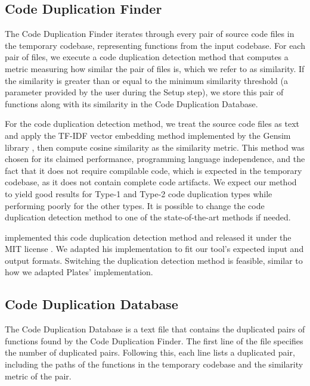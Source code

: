 \subsection{Code Duplication Finder}

\label{subsec:code_finder}

The Code Duplication Finder iterates through every pair of source code files in the temporary codebase, representing functions from the input codebase. For each pair of files, we execute a code duplication detection method that computes a metric measuring how similar the pair of files is, which we refer to as similarity. If the similarity is greater than or equal to the minimum similarity threshold (a parameter provided by the user during the Setup step), we store this pair of functions along with its similarity in the Code Duplication Database.

For the code duplication detection method, we treat the source code files 
as text and apply the TF-IDF vector embedding method implemented by the 
Gensim library \citep{gensim}, then compute cosine similarity as the 
similarity metric. This method was chosen for its claimed performance, 
programming language independence, and the fact that it does not require 
compilable code, which is expected in the temporary codebase, as it does 
not contain complete code artifacts. We expect our method to yield good 
results for Type-1 and Type-2 code duplication types while performing 
poorly for the other types. It is possible to change the code duplication 
detection method to one of the state-of-the-art methods if needed.

\cite{platistool} implemented this code duplication detection method and 
released it under the MIT license \citep{mitlicense}. We adapted his 
implementation to fit our tool's expected input and output formats. 
Switching the duplication detection method is feasible, similar to how 
we adapted Plates' implementation.

\subsection{Code Duplication Database}

The Code Duplication Database is a text file that contains the duplicated pairs of functions found by the Code Duplication Finder. The first line of the file specifies the number of duplicated pairs. Following this, each line lists a duplicated pair, including the paths of the functions in the temporary codebase and the similarity metric of the pair.

